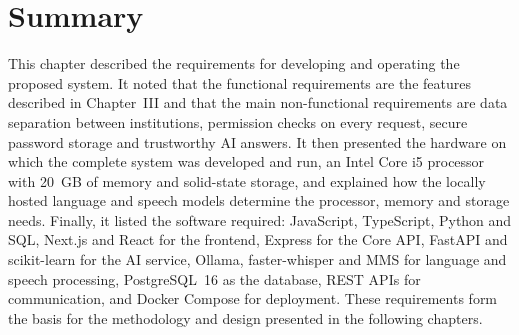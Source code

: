 \section{Summary}
This chapter described the requirements for developing and operating the proposed system. It noted that the functional requirements are the features described in Chapter~III and that the main non-functional requirements are data separation between institutions, permission checks on every request, secure password storage and trustworthy AI answers. It then presented the hardware on which the complete system was developed and run, an Intel Core i5 processor with 20~GB of memory and solid-state storage, and explained how the locally hosted language and speech models determine the processor, memory and storage needs. Finally, it listed the software required: JavaScript, TypeScript, Python and SQL, Next.js and React for the frontend, Express for the Core API, FastAPI and scikit-learn for the AI service, Ollama, faster-whisper and MMS for language and speech processing, PostgreSQL~16 as the database, REST APIs for communication, and Docker Compose for deployment. These requirements form the basis for the methodology and design presented in the following chapters.
